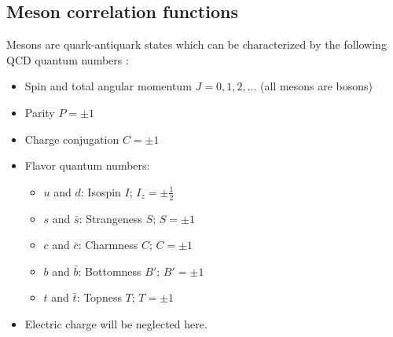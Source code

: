 \subsection{Meson correlation functions}
    Mesons are quark-antiquark states which can be characterized by the following QCD quantum numbers \cite{introduction_to_lattice_hadron_spectroscopy}:
    \begin{itemize}
        \item Spin and total angular momentum $J = 0, 1, 2,...$ (all mesons are bosons)
        \item Parity $P = \pm1$
        \item Charge conjugation $C = \pm1$
        \item Flavor quantum numbers:
            \begin{itemize}
                \item $u$ and $d$: Isospin $I$; $I_z = \pm\frac{1}{2}$
                \item $s$ and $\bar{s}$: Strangeness $S$; $S = \pm 1$
                \item $c$ and $\bar{c}$: Charmness $C$; $C = \pm 1$
                \item $b$ and $\bar{b}$: Bottomness $B'$; $B' = \pm 1$
                \item $t$ and $\bar{t}$: Topness $T$; $T = \pm 1$
            \end{itemize}
        \item Electric charge will be neglected here.
    \end{itemize}
    
